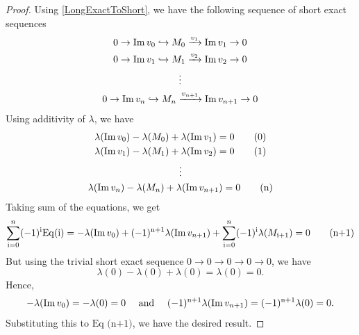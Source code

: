 \begin{proof}
    Using \autoref{LongExactToShort}, we have the following sequence of short exact sequences 
    \begin{gather*}
        0 \to \operatorname{Im} v_0 \hookrightarrow M_0 \xrightarrow{v_1} \operatorname{Im} v_1 \to 0\\
        0 \to \operatorname{Im} v_1 \hookrightarrow M_1 \xrightarrow{v_2} \operatorname{Im} v_2 \to 0\\
        \vdots\\
        0 \to \operatorname{Im} v_n \hookrightarrow M_n \xrightarrow{v_{n+1}} \operatorname{Im} v_{n+1} \to 0\\
    \end{gather*}
    Using additivity of \( \lambda \), we have
    \begin{gather*}
        \lambda(\operatorname{Im} v_0) - \lambda(M_0) + \lambda(\operatorname{Im} v_1) = 0\tag{0}\\
        \lambda(\operatorname{Im} v_1) - \lambda(M_1) + \lambda(\operatorname{Im} v_2)= 0\tag{1}\\
        \vdots\\
        \lambda(\operatorname{Im} v_n) - \lambda(M_n) + \lambda(\operatorname{Im} v_{n+1}) = 0\tag{n}\\
    \end{gather*}
    Taking sum of the equations, we get
    \[
        \sum_{\text{i}=0}^n (-1)^\text{i} \mathrm{Eq} (\text{i}) = -\lambda(\operatorname{Im} v_0) + (-1)^\text{n+1} \lambda(\operatorname{Im} v_{n+1}) + \sum_{\text{i} = 0}^n (-1)^\text{i} \lambda(M_{\text{i+1}}) = 0\tag{n+1}
    \]
    But using the trivial short exact sequence \( 0 \to 0 \to 0 \to 0 \to 0 \), we have 
     \[
        \lambda(0) - \lambda(0) + \lambda(0) = \lambda(0) = 0.
    \]
    Hence, 
    \[
        -\lambda(\operatorname{Im} v_0) = -\lambda(0) = 0 \quad \text{ and } \quad (-1)^\text{n+1} \lambda(\operatorname{Im} v_{n+1}) = (-1)^\text{n+1} \lambda(0) = 0.
    \]
    Substituting this to \( \text{Eq (n+1)} \), we have the desired result.
\end{proof}
